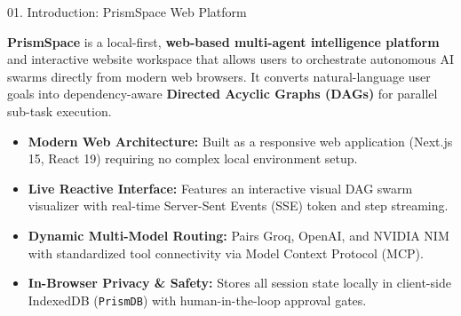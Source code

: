 \documentclass[aspectratio=169,10pt]{beamer}
\begin{document}
\begin{frame}[c]{01. Introduction: PrismSpace Web Platform}
\centering
\begin{minipage}{0.94\linewidth}
\begin{tcolorbox}[
  enhanced, arc=5pt, colframe=lavenderDark!80, colback=lavenderLight!25,
  boxrule=0.9pt,
  left=14pt, right=14pt, top=12pt, bottom=12pt
]
\fontsize{8.6}{12.6}\selectfont\sffamily\color{lavenderDeep}
  \textbf{\fontsize{10.2}{13.0}\selectfont\color{lavenderDark}PrismSpace} is a local-first, \textbf{web-based multi-agent intelligence platform} and interactive website workspace that allows users to orchestrate autonomous AI swarms directly from modern web browsers. It converts natural-language user goals into dependency-aware \textbf{Directed Acyclic Graphs (DAGs)} for parallel sub-task execution.

  \vspace{0.45em}
  \fontsize{7.6}{10.2}\selectfont
  \begin{itemize}\setlength{\itemsep}{3.5pt}
    \item \textbf{\color{lavenderDark}Modern Web Architecture:} Built as a responsive web application (Next.js 15, React 19) requiring no complex local environment setup.
    \item \textbf{\color{lavenderDark}Live Reactive Interface:} Features an interactive visual DAG swarm visualizer with real-time Server-Sent Events (SSE) token and step streaming.
    \item \textbf{\color{lavenderDark}Dynamic Multi-Model Routing:} Pairs Groq, OpenAI, and NVIDIA NIM with standardized tool connectivity via Model Context Protocol (MCP).
    \item \textbf{\color{lavenderDark}In-Browser Privacy \& Safety:} Stores all session state locally in client-side IndexedDB (\texttt{PrismDB}) with human-in-the-loop approval gates.
  \end{itemize}
\end{tcolorbox}
\end{minipage}
\end{frame}
\end{document}
